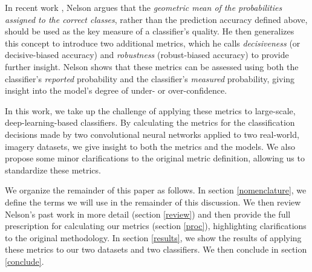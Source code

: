 \documentclass{spie}
\begin{document}
In recent work \cite{nelson, nelson2}, Nelson argues that the \textit{geometric mean of the probabilities assigned to the correct classes}, rather than the prediction accuracy defined above, should be used as the key measure of a classifier's quality. He then generalizes this concept to introduce two additional metrics, which he calls \textit{decisiveness} (or decisive-biased accuracy) and \textit{robustness} (robust-biased accuracy) to provide further insight. Nelson shows that these metrics can be assessed using both the classifier's \textit{reported} probability and the classifier's \textit{measured} probability, giving insight into the model's degree of under- or over-confidence. 

In this work, we take up the challenge of applying these metrics to large-scale, deep-learning-based classifiers. By calculating the metrics for the classification decisions made by two convolutional neural networks applied to two real-world, imagery datasets, we give insight to both the metrics and the models. We also propose some minor clarifications to the original metric definition, allowing us to standardize these metrics. 

We organize the remainder of this paper as follows. In section \ref{nomenclature}, we define the terms we will use in the remainder of this discussion. We then review Nelson's past work in more detail (section \ref{review}) and then provide the full prescription for calculating our metrics (section \ref{proc}), highlighting clarifications to the original methodology. In section \ref{results}, we show the results of applying these metrics to our two datasets and two classifiers. We then conclude in section \ref{conclude}. 
\end{document}
